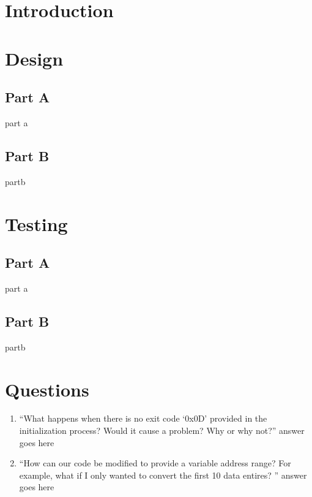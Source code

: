 \documentclass[letterpaper]{article}
\begin{document}
  \begin{titlepage}
    \begin{center}
    \end{center}
\end{titlepage}

\tableofcontents

\section{Introduction}

\section{Design}

  \subsection{Part A}
    part a

  \subsection{Part B}
    partb


\section{Testing}
  \subsection{Part A}
    part a

  \subsection{Part B}
    partb

\section{Questions}
  \begin{enumerate}
    \item ``What happens when there is no exit code ‘0x0D’ provided in the initialization process? Would it cause a problem? Why or why not?''
    answer goes here

    \item ``How can our code be modified to provide a variable address range? For example, what if I only wanted to convert the first 10 data entires? ''
    answer goes here
  \end{enumerate}
\end{document}
